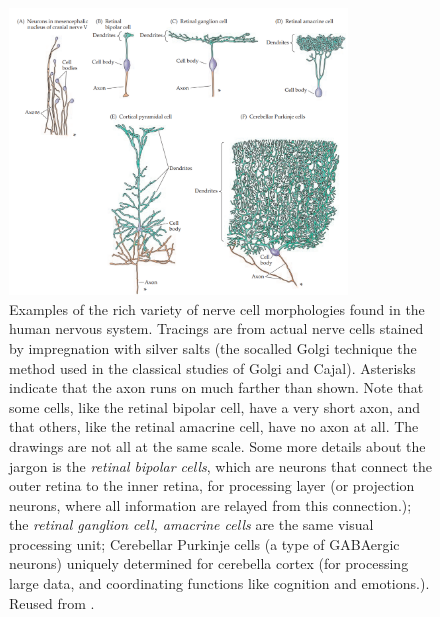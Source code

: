 \begin{figure}[h!]
    \centering
    \includegraphics[width=0.8\textwidth]{img/overwhelminglycomplexshit.png}
    \caption{Examples of the rich variety of nerve cell morphologies found in the human nervous system. Tracings are from actual nerve cells stained by impregnation with silver salts (the socalled Golgi technique the method used in the classical studies of Golgi and Cajal). Asterisks indicate that the axon runs on much farther than shown. Note that some cells, like the retinal bipolar cell, have a very short axon, and that others, like the retinal amacrine cell, have no axon at all. The drawings are not all at the same scale. Some more details about the jargon is the \textit{retinal bipolar cells}, which are neurons that connect the outer retina to the inner retina, for processing layer (or projection neurons, where all information are relayed from this connection.); the \textit{retinal ganglion cell, amacrine cells} are the same visual processing unit; Cerebellar Purkinje cells (a type of GABAergic neurons) uniquely determined for cerebella cortex (for processing large data, and coordinating functions like cognition and emotions.). Reused from \cite{purves_neuroscience_2004}.}
\end{figure}

